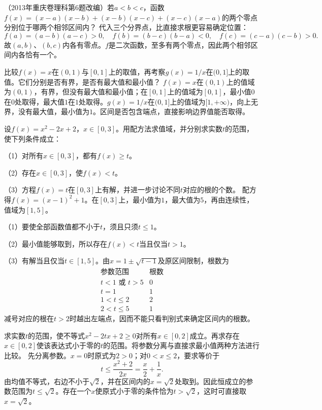 （2013年重庆卷理科第6题改编）若\(a<b<c\)，函数\(f(x)=(x-a)(x-b)+(x-b)(x-c)+(x-c)(x-a)\)的两个零点分别位于哪两个相邻区间内？
\solutionanswer
代入三个分界点，比直接求根更容易确定位置：
\[
f(a)=(a-b)(a-c)>0,\quad
f(b)=(b-c)(b-a)<0,\quad
f(c)=(c-a)(c-b)>0.
\]
故\((a,b)\)、\((b,c)\)内各有零点。\(f\)是二次函数，至多有两个零点，因此两个相邻区间内各恰有一个。


比较\(f(x)=x\)在\((0,1)\)与\([0,1]\)上的取值，再考察\(g(x)=1/x\)在\((0,1]\)上的取值。它们分别是否有界，是否有最大值和最小值？
\solutionanswer
\(f(x)=x\)在\((0,1)\)上的值域为\((0,1)\)，有界，但没有最大值和最小值；在\([0,1]\)上的值域为\([0,1]\)，最小值\(0\)在\(0\)处取得，最大值\(1\)在\(1\)处取得。\(g(x)=1/x\)在\((0,1]\)上的值域为\([1,+\infty)\)，向上无界，没有最大值，最小值为\(1\)。区间是否包含端点，直接影响边界值能否取得。


设\(f(x)=x^2-2x+2\)，\(x\in[0,3]\)。用配方法求值域，并分别求实数\(t\)的范围，使下列条件成立：

（1）对所有\(x\in[0,3]\)，都有\(f(x)\ge t\)。

（2）存在\(x\in[0,3]\)，使\(f(x)<t\)。

（3）方程\(f(x)=t\)在\([0,3]\)上有解，并进一步讨论不同\(t\)对应的根的个数。
\solutionanswer
配方得\(f(x)=(x-1)^2+1\)。在\([0,3]\)上，最小值为\(1\)，最大值为\(5\)，再由连续性，值域为\([1,5]\)。

（1）要使全部函数值都不小于\(t\)，须且只须\(t\le1\)。

（2）最小值能够取到，所以存在\(f(x)<t\)当且仅当\(t>1\)。

（3）有解当且仅当\(t\in[1,5]\)。由\(x=1\pm\sqrt{t-1}\)及原区间限制，根数为
\[
\begin{array}{c|c}
\text{参数范围}&\text{根数}\\\hline
 t<1\text{ 或 }t>5&0\\
 t=1&1\\
 1<t\le2&2\\
 2<t\le5&1
\end{array}
\]
减号对应的根在\(t>2\)时越出左端点，因而不能只看判别式来确定区间内的根数。


求实数\(t\)的范围，使不等式\(x^2-2tx+2\ge0\)对所有\(x\in[0,2]\)成立。再求存在\(x\in[0,2]\)使该表达式小于零的\(t\)的范围。将参数分离与直接求最小值两种方法进行比较。
\solutionanswer
先分离参数。\(x=0\)时原式为\(2>0\)；对\(0<x\le2\)，要求等价于
\[
t\le\frac{x^2+2}{2x}=\frac x2+\frac1x.
\]
由均值不等式，右边不小于\(\sqrt2\)，并在区间内的\(x=\sqrt2\)处取到。因此恒成立的参数范围为\(t\le\sqrt2\)。存在一个\(x\)使原式小于零的条件恰为\(t>\sqrt2\)，这时可直接取\(x=\sqrt2\)。

